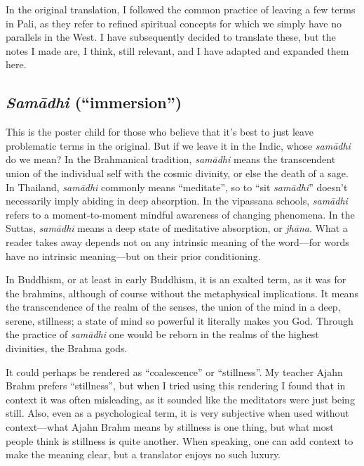 \documentclass[12pt,openany]{book}%
\begin{document}
In the original translation, I followed the common practice of leaving a few terms in Pali, as they refer to refined spiritual concepts for which we simply have no parallels in the West. I have subsequently decided to translate these, but the notes I made are, I think, still relevant, and I have adapted and expanded them here.

\subsection*{\textit{\textsanskrit{Samādhi}} (“immersion”)}

This is the poster child for those who believe that it’s best to just leave problematic terms in the original. But if we leave it in the Indic, whose \textit{\textsanskrit{samādhi}} do we mean? In the Brahmanical tradition, \textit{\textsanskrit{samādhi}} means the transcendent union of the individual self with the cosmic divinity, or else the death of a sage. In Thailand, \textit{\textsanskrit{samādhi}} commonly means “meditate”, so to “sit \textit{\textsanskrit{samādhi}}” doesn’t necessarily imply abiding in deep absorption. In the vipassana schools, \textit{\textsanskrit{samādhi}} refers to a moment-to-moment mindful awareness of changing phenomena. In the Suttas, \textit{\textsanskrit{samādhi}} means a deep state of meditative absorption, or \textit{\textsanskrit{jhāna}}. What a reader takes away depends not on any intrinsic meaning of the word—for words have no intrinsic meaning—but on their prior conditioning.

In Buddhism, or at least in early Buddhism, it is an exalted term, as it was for the brahmins, although of course without the metaphysical implications. It means the transcendence of the realm of the senses, the union of the mind in a deep, serene, stillness; a state of mind so powerful it literally makes you God. Through the practice of \textit{\textsanskrit{samādhi}} one would be reborn in the realms of the highest divinities, the Brahma gods.

It could perhaps be rendered as “coalescence” or “stillness”. My teacher Ajahn Brahm prefers “stillness”, but when I tried using this rendering I found that in context it was often misleading, as it sounded like the meditators were just being still. Also, even as a psychological term, it is very subjective when used without context—what Ajahn Brahm means by stillness is one thing, but what most people think is stillness is quite another. When speaking, one can add context to make the meaning clear, but a translator enjoys no such luxury.
\end{document}
